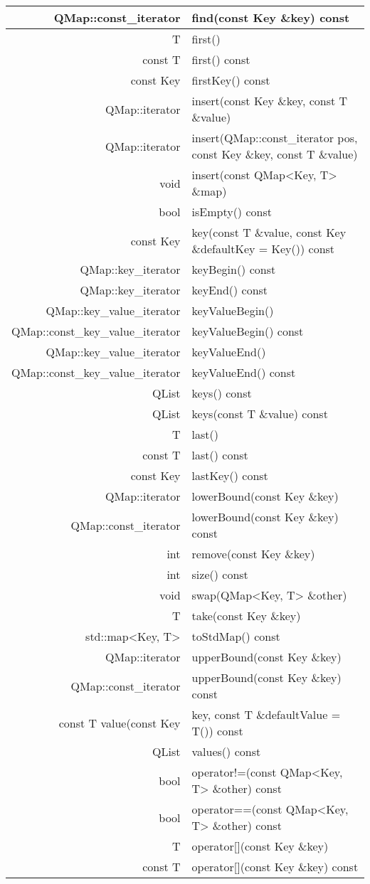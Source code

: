 \begin{longtable}{|r|m{20em}|}
\hline
QMap::const\_iterator	&find(const Key \&key) const \\ 
\hline
T &	first() \\ 
\hline
const T &	first() const \\
\hline
const Key &	firstKey() const \\
\hline
QMap::iterator	&insert(const Key \&key, const T \&value) \\
\hline
QMap::iterator	&insert(QMap::const_iterator pos, const Key \&key, const T \&value) \\
\hline
void	&insert(const QMap<Key, T> \&map)\\
\hline
bool	&isEmpty() const \\
\hline
const Key & key(const T \&value, const Key \&defaultKey = Key()) const \\
\hline
QMap::key\_iterator&	keyBegin() const\\
\hline
QMap::key\_iterator &	keyEnd() const \\
\hline
QMap::key\_value\_iterator	&keyValueBegin() \\
\hline
QMap::const\_key\_value\_iterator&	keyValueBegin() const \\
\hline
QMap::key\_value\_iterator&	keyValueEnd() \\ 
\hline
QMap::const\_key\_value\_iterator&	keyValueEnd() const \\
QList&	keys() const \\
\hline
QList	&keys(const T \&value) const \\
T &	last() \\ 
\hline
const T &	last() const \\ 
\hline
const Key &	lastKey() const \\ 
\hline
QMap::iterator	&lowerBound(const Key \&key) \\ 
\hline
QMap::const\_iterator	&lowerBound(const Key \&key) const \\
\hline
int	&remove(const Key \&key) \\
\hline
int &	size() const \\ 
\hline
void & swap(QMap<Key, T> \&other) \\ 
\hline
T	& take(const Key \&key) \\ 
\hline
std::map<Key, T> &	toStdMap() const \\
\hline
QMap::iterator&	upperBound(const Key \&key) \\ 
\hline
QMap::const\_iterator &	upperBound(const Key \&key) const \\
\hline
const T	value(const Key &key, const T \&defaultValue = T()) const \\
\hline
QList	& values() const\\ 
\hline
bool	& operator!=(const QMap<Key, T> \&other) const \\ 
\hline
bool	& operator==(const QMap<Key, T> \&other) const \\ 
\hline
T &	operator[](const Key \&key) \\ 
\hline
const T	 &operator[](const Key \&key) const \\ 
\hline
\end{longtable}


